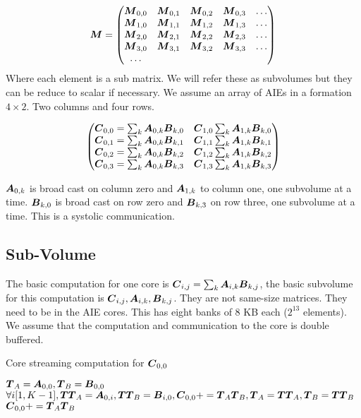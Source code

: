 \documentclass[journal]{IEEEtran}
\begin{document}
\begin{equation*} {\boldsymbol M} =
    \begin{pmatrix}
    {\boldsymbol M}_{0,0} & {\boldsymbol M}_{0,1} & {\boldsymbol M}_{0,2} & {\boldsymbol M}_{0,3} & \dots \\
    {\boldsymbol M}_{1,0} & {\boldsymbol M}_{1,1} & {\boldsymbol M}_{1,2} & {\boldsymbol M}_{1,3} & \dots \\
    {\boldsymbol M}_{2,0} & {\boldsymbol M}_{2,1} & {\boldsymbol M}_{2,2} & {\boldsymbol M}_{2,3} & \dots \\
    {\boldsymbol M}_{3,0} & {\boldsymbol M}_{3,1} & {\boldsymbol M}_{3,2} & {\boldsymbol M}_{3,3} & \dots \\
    \dots
  \end{pmatrix}  
\end{equation*}
Where each element is a sub matrix. We will refer these as subvolumes
but they can be reduce to scalar if necessary.  We assume an array of
AIEs in a formation $4 \times 2$. Two columns and four rows.

{\small \begin{equation}
  \label{eq:gemm-fatc}
  \begin{pmatrix}
    \Vc{C}_{0,0} = \sum_k \Vc{A}_{0,k}\Vc{B}_{k,0} & \Vc{C}_{1,0} \sum_k \Vc{A}_{1,k}\Vc{B}_{k,0}\\
    \Vc{C}_{0,1} = \sum_k \Vc{A}_{0,k}\Vc{B}_{k,1} & \Vc{C}_{1,1} \sum_k \Vc{A}_{1,k}\Vc{B}_{k,1}\\
    \Vc{C}_{0,2} = \sum_k \Vc{A}_{0,k}\Vc{B}_{k,2} & \Vc{C}_{1,2} \sum_k \Vc{A}_{1,k}\Vc{B}_{k,2}\\
    \Vc{C}_{0,3} = \sum_k \Vc{A}_{0,k}\Vc{B}_{k,3} & \Vc{C}_{1,3} \sum_k \Vc{A}_{1,k}\Vc{B}_{k,3}\\
  \end{pmatrix}  
\end{equation}
}

${\boldsymbol A}_{0,k}$ is broad cast on column zero and ${\boldsymbol A}_{1,k}$ to
column one, one subvolume at a time. ${\boldsymbol B}_{k,0}$ is broad cast on
row zero and ${\boldsymbol B}_{k,3}$ on row three, one subvolume at a
time. This is a systolic communication.

\subsection{Sub-Volume}
The basic computation for one core is ${\boldsymbol C}_{i,j} = \sum_k
{\boldsymbol A}_{i,k}{\boldsymbol B}_{k,j}$, the basic subvolume for this computation is
${\boldsymbol C}_{i,j}, {\boldsymbol A}_{i,k},{\boldsymbol B}_{k,j}$. They are not same-size matrices. They need to be in the AIE cores. This has eight banks of 8
KB each ($2^{13}$ elements).  We assume that the computation and
communication to the core is double buffered.
\begin{algorithm}
  \caption{Core streaming computation for ${\boldsymbol C}_{0,0}$}
  \label{alg:one}
  \begin{algorithmic}[1]
    \STATE ${\boldsymbol T}_A = {\boldsymbol A}_{0,0}, {\boldsymbol T}_B = {\boldsymbol B}_{0,0}$ 
    \STATE $\forall i [1,K-1], {\boldsymbol {TT}}_A = {\boldsymbol A}_{0,i} , {\boldsymbol {TT}}_B = {\boldsymbol B}_{i,0},    {\boldsymbol C}_{0,0} += {\boldsymbol T}_{A}{\boldsymbol T}_{B}, {\boldsymbol T}_A = {\boldsymbol {TT}}_{A} , {\boldsymbol T}_B = {\boldsymbol {TT}}_B$ 
    \STATE ${\boldsymbol C}_{0,0} += {\boldsymbol T}_{A}{\boldsymbol T}_{B}$ 
  \end{algorithmic}  
\end{algorithm}
\end{document}
